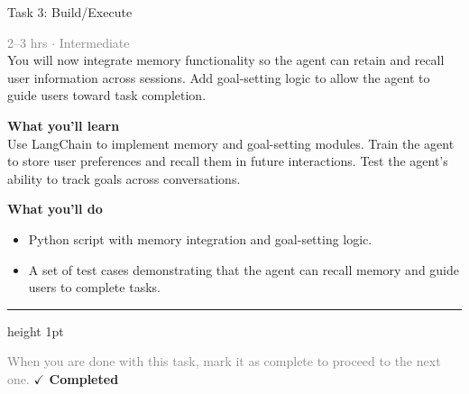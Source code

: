 \documentclass[10pt,a4paper]{article}
\begin{document}
\begin{taskbox}{Task 3: Build/Execute}

    {\small \textcolor{gray}{2--3 hrs $\cdot$ Intermediate}}\\[12pt]

      
You will now integrate memory functionality so the agent can retain and recall user information across sessions. Add goal-setting logic to allow the agent to guide users toward task completion.


\vspace{8pt}
{\large \textbf{\textcolor{brandLight}{What you'll learn}}}\\[4pt]  
Use LangChain to implement memory and goal-setting modules. Train the agent to store user preferences and recall them in future interactions. Test the agent's ability to track goals across conversations.

\vspace{8pt}
{\large \textbf{\textcolor{brandLight}{What you'll do}}}\\[4pt]  
\begin{itemize}
    \item Python script with memory integration and goal-setting logic.  
    \item A set of test cases demonstrating that the agent can recall memory and guide users to complete tasks.\par
\end{itemize}

    \vspace{16pt}

    \textcolor{cardBorder}{\hrule height 1pt}\vspace{8pt}

    \small \textcolor{gray}{When you are done with this task, mark it as complete to proceed to the next one.} \hfill \textbf{\textcolor{brandDark}{$\checkmark$ Completed}}

\end{taskbox}
\end{document}
